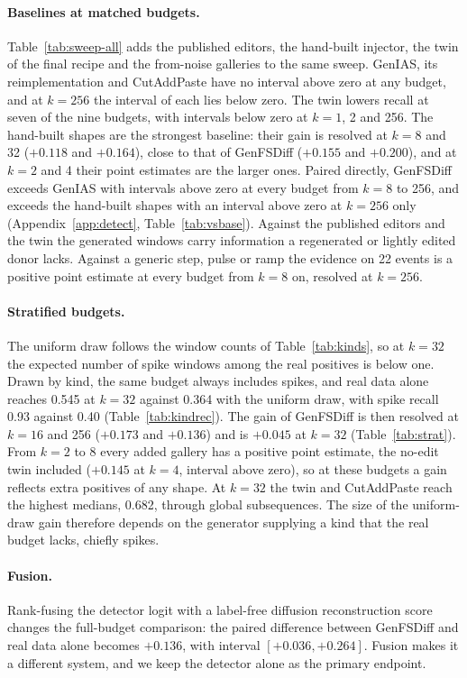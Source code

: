 \documentclass[11pt,a4paper]{article}
\begin{document}
\paragraph{Baselines at matched budgets.}
Table~\ref{tab:sweep-all} adds the published editors, the hand-built
injector, the twin of the final recipe and the from-noise galleries to the
same sweep. GenIAS, its reimplementation and CutAddPaste have no interval
above zero at any budget, and at $k = 256$ the interval of each lies below
zero. The twin lowers
recall at seven of the nine budgets, with intervals below zero at $k = 1$, 2
and 256. The hand-built shapes are the strongest baseline: their gain is
resolved at $k = 8$ and 32 ($+0.118$ and $+0.164$), close to that of GenFSDiff
($+0.155$ and $+0.200$), and at $k = 2$ and 4 their point estimates are the
larger ones. Paired directly, GenFSDiff exceeds GenIAS with intervals above
zero at every budget from $k = 8$ to 256, and exceeds the hand-built shapes
with an interval above zero at $k = 256$ only
(Appendix~\ref{app:detect}, Table~\ref{tab:vsbase}). Against the published
editors and the twin the generated windows carry information a regenerated
or lightly edited donor lacks. Against a generic step, pulse or ramp the
evidence on 22 events is a positive point estimate at every budget from
$k = 8$ on, resolved at $k = 256$.

\paragraph{Stratified budgets.}
The uniform draw follows the window counts of Table~\ref{tab:kinds}, so at
$k = 32$ the expected number of spike windows among the real positives is
below one. Drawn by kind, the same budget always includes spikes, and real
data alone reaches 0.545 at $k = 32$ against 0.364 with the uniform draw,
with spike recall 0.93 against 0.40 (Table~\ref{tab:kindrec}). The gain of
GenFSDiff is then resolved at $k = 16$ and 256 ($+0.173$ and $+0.136$) and is
$+0.045$ at $k = 32$ (Table~\ref{tab:strat}). From $k = 2$ to 8 every added
gallery has a positive point estimate, the no-edit twin included ($+0.145$ at
$k = 4$, interval above zero), so at these budgets a gain reflects extra
positives of any shape. At $k = 32$ the twin
and CutAddPaste reach the highest medians, 0.682, through global
subsequences. The size of the uniform-draw gain therefore depends on the
generator supplying a kind that the real budget lacks, chiefly spikes.


\paragraph{Fusion.}
Rank-fusing the detector logit with a label-free diffusion reconstruction
score changes the full-budget comparison: the paired difference between
GenFSDiff and real data alone becomes $+0.136$, with interval
$[+0.036, +0.264]$. Fusion makes it a different system, and we keep the
detector alone as the primary endpoint.
\end{document}
